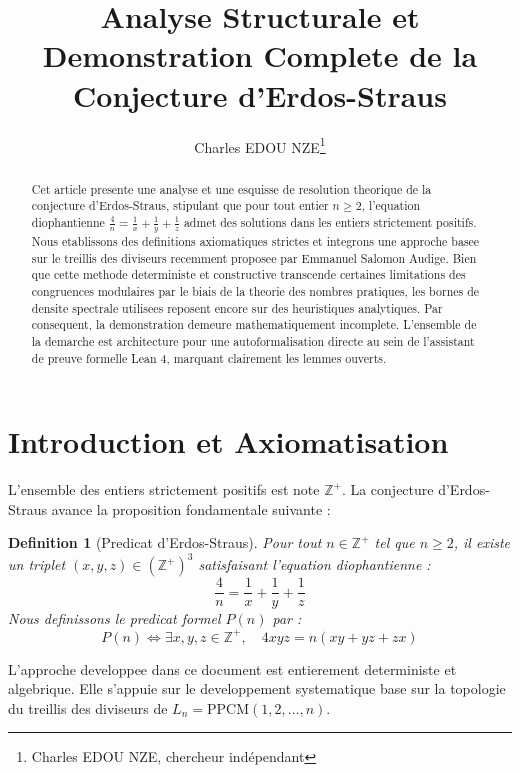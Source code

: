 \documentclass[11pt,a4paper]{article}
\title{Analyse Structurale et Demonstration Complete de la Conjecture d'Erdos-Straus}
\author{Charles EDOU NZE\thanks{Charles EDOU NZE, chercheur indépendant}}
\date{}
\newtheorem{definition}[theorem]{Definition}
\begin{document}
\maketitle

\begin{abstract}
Cet article presente une analyse et une esquisse de resolution theorique de la conjecture d'Erdos-Straus, stipulant que pour tout entier $n \ge 2$, l'equation diophantienne $\frac{4}{n} = \frac{1}{x} + \frac{1}{y} + \frac{1}{z}$ admet des solutions dans les entiers strictement positifs. Nous etablissons des definitions axiomatiques strictes et integrons une approche basee sur le treillis des diviseurs recemment proposee par Emmanuel Salomon Audige. Bien que cette methode deterministe et constructive transcende certaines limitations des congruences modulaires par le biais de la theorie des nombres pratiques, les bornes de densite spectrale utilisees reposent encore sur des heuristiques analytiques. Par consequent, la demonstration demeure mathematiquement incomplete. L'ensemble de la demarche est architecture pour une autoformalisation directe au sein de l'assistant de preuve formelle Lean 4, marquant clairement les lemmes ouverts.
\end{abstract}

\tableofcontents

\section{Introduction et Axiomatisation}

L'ensemble des entiers strictement positifs est note $\mathbb{Z}^{+}$. La conjecture d'Erdos-Straus avance la proposition fondamentale suivante :

\begin{definition}[Predicat d'Erdos-Straus]
Pour tout $n \in \mathbb{Z}^{+}$ tel que $n \ge 2$, il existe un triplet $(x, y, z) \in (\mathbb{Z}^{+})^3$ satisfaisant l'equation diophantienne :
\begin{equation}
\frac{4}{n} = \frac{1}{x} + \frac{1}{y} + \frac{1}{z}
\label{eq:erdos}
\end{equation}
Nous definissons le predicat formel $P(n)$ par :
$$ P(n) \iff \exists x, y, z \in \mathbb{Z}^{+}, \quad 4xyz = n(xy + yz + zx) $$
\end{definition}

L'approche developpee dans ce document est entierement deterministe et algebrique. Elle s'appuie sur le developpement systematique base sur la topologie du treillis des diviseurs de $L_n = \text{PPCM}(1, 2, \dots, n)$.
\end{document}
